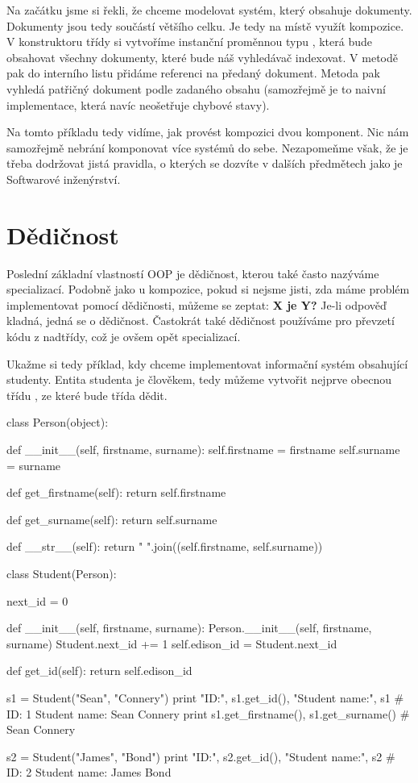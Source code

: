 Na začátku jsme si řekli, že chceme modelovat systém, který obsahuje dokumenty. Dokumenty jsou tedy součástí
většího celku. Je tedy na místě využít kompozice.
V konstruktoru třídy  si vytvoříme instanční proměnnou typu , která bude
obsahovat všechny dokumenty, které bude náš vyhledávač indexovat. V metodě  pak do
interního listu přidáme referenci na předaný dokument. Metoda  pak vyhledá patřičný dokument
podle zadaného obsahu (samozřejmě je to naivní implementace, která navíc neošetřuje chybové stavy).

Na tomto příkladu tedy vidíme, jak provést kompozici dvou komponent. Nic nám samozřejmě nebrání komponovat
více systémů do sebe. Nezapomeňme však, že je třeba dodržovat jistá pravidla, o kterých se dozvíte v dalších
předmětech jako je Softwarové inženýrství.

\section{Dědičnost}

Poslední základní vlastností OOP je dědičnost, kterou také často nazýváme specializací. Podobně jako
u kompozice, pokud si nejsme jisti, zda máme problém implementovat pomocí dědičnosti, můžeme se zeptat:
\textbf{X je Y?} Je-li odpověď kladná, jedná se o dědičnost. Častokrát také dědičnost používáme
pro převzetí kódu z nadtřídy, což je ovšem opět specializací.

Ukažme si tedy příklad, kdy chceme implementovat informační systém obsahující studenty. Entita studenta
je člověkem, tedy můžeme vytvořit nejprve obecnou třídu , ze které bude
třída  dědit.

\begin{python}
class Person(object):

    def __init__(self, firstname, surname):
        self.firstname = firstname
        self.surname = surname

    def get_firstname(self):
        return self.firstname

    def get_surname(self):
        return self.surname

    def __str__(self):
        return " ".join((self.firstname, self.surname))


class Student(Person):

    next_id = 0

    def __init__(self, firstname, surname):
        Person.__init__(self, firstname, surname)
        Student.next_id += 1
        self.edison_id = Student.next_id

    def get_id(self):
        return self.edison_id


s1 = Student("Sean", "Connery")
print "ID:", s1.get_id(), "Student name:", s1
# ID: 1 Student name: Sean Connery
print s1.get_firstname(), s1.get_surname() # Sean Connery

s2 = Student("James", "Bond")
print "ID:", s2.get_id(), "Student name:", s2
# ID: 2 Student name: James Bond
\end{python}

